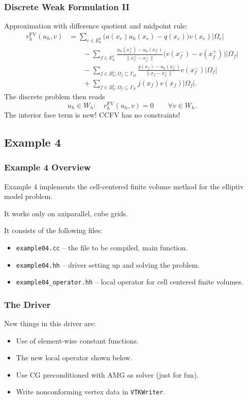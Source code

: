 \begin{frame}
\frametitle{Discrete Weak Formulation II}
Approximation with difference quotient and midpoint rule:
\begin{equation*}
\begin{split}
r_h^{\text{FV}}(u_h,v) & = \sum_{e\in E_h^0} \bigl(a(x_e)u_h(x_e) - q(x_e)\bigr) v(x_e) |\Omega_e|\\
&\qquad - \sum_{f\in E_h^1} \frac{u_h(x_f^+)-u_h(x_f^-)}{\|x_f^+ - x_f^-\|} 
\bigl(v(x_f^-) - v(x_f^+)\bigr) |\Omega_f|\\
&\qquad - \sum_{f\in B_h^1; \Omega_f\subseteq\Gamma_D} \frac{g(x_f)-u_h(x_f^-)}{\|x_f - x_f^-\|} 
v(x_f^-) |\Omega_f|\\
&\qquad + \sum_{f\in B_h^1; \Omega_f\subseteq\Gamma_N} j(x_f) v(x_f) |\Omega_f| .
\end{split}
\end{equation*}
The discrete problem then reads
\begin{equation*}
u_h \in W_h : \quad r_h^{\text{FV}}(u_h,v) = 0 \qquad \forall v \in W_h.
\end{equation*}
The interior face term is new! CCFV has no constraints!
\end{frame}

\subsection{Example 4}

\begin{frame}
\frametitle{Example 4 Overview}
Example 4 implements the cell-centered finite volume method for the elliptiv model problem.

It works only on axiparallel, cube grids.

It consists of the following files:
\begin{itemize}
\item \lstinline{example04.cc} -- the file to be compiled, main function. 
\item \lstinline{example04.hh} -- driver setting up and solving the problem. 
\item \lstinline{example04_operator.hh} -- local operator for cell centered finite volumes.
\end{itemize}
\end{frame}

\begin{frame}
\frametitle{The Driver}
New things in this driver are:
\begin{itemize}
\item Use of element-wise constant functions.
\item The new local operator shown below.
\item Use CG preconditioned with AMG as solver (just for fun).
\item Write nonconforming vertex data in \lstinline{VTKWriter}.
\end{itemize}
\end{frame}

